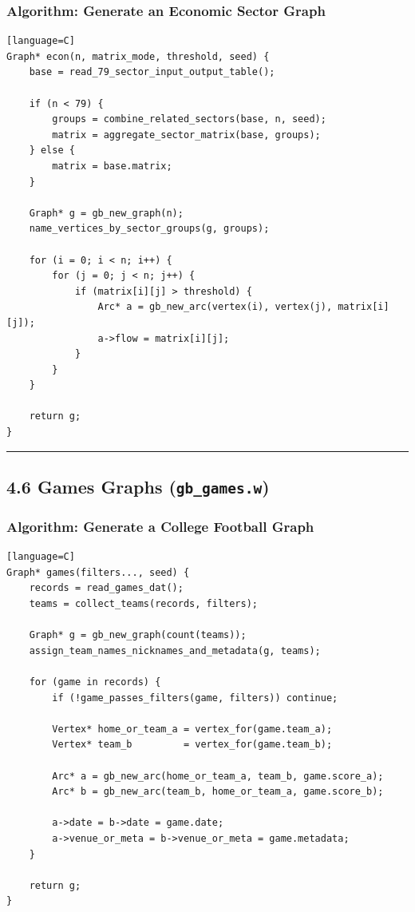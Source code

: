 \documentclass[11pt]{article}
\begin{document}
\subsubsection{Algorithm: Generate an Economic Sector Graph}\label{algorithm-generate-an-economic-sector-graph}

\begin{verbatim}[language=C]
Graph* econ(n, matrix_mode, threshold, seed) {
    base = read_79_sector_input_output_table();

    if (n < 79) {
        groups = combine_related_sectors(base, n, seed);
        matrix = aggregate_sector_matrix(base, groups);
    } else {
        matrix = base.matrix;
    }

    Graph* g = gb_new_graph(n);
    name_vertices_by_sector_groups(g, groups);

    for (i = 0; i < n; i++) {
        for (j = 0; j < n; j++) {
            if (matrix[i][j] > threshold) {
                Arc* a = gb_new_arc(vertex(i), vertex(j), matrix[i][j]);
                a->flow = matrix[i][j];
            }
        }
    }

    return g;
}
\end{verbatim}

\begin{center}\rule{0.5\linewidth}{0.5pt}\end{center}

\subsection{\texorpdfstring{4.6 Games Graphs (\texttt{gb\_games.w})}{4.6 Games Graphs (gb\_games.w)}}\label{games-graphs-gb_games.w}

\subsubsection{Algorithm: Generate a College Football Graph}\label{algorithm-generate-a-college-football-graph}

\begin{verbatim}[language=C]
Graph* games(filters..., seed) {
    records = read_games_dat();
    teams = collect_teams(records, filters);

    Graph* g = gb_new_graph(count(teams));
    assign_team_names_nicknames_and_metadata(g, teams);

    for (game in records) {
        if (!game_passes_filters(game, filters)) continue;

        Vertex* home_or_team_a = vertex_for(game.team_a);
        Vertex* team_b         = vertex_for(game.team_b);

        Arc* a = gb_new_arc(home_or_team_a, team_b, game.score_a);
        Arc* b = gb_new_arc(team_b, home_or_team_a, game.score_b);

        a->date = b->date = game.date;
        a->venue_or_meta = b->venue_or_meta = game.metadata;
    }

    return g;
}
\end{verbatim}
\end{document}
